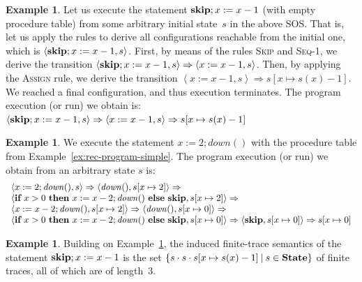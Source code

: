 \documentclass[10pt,a4paper]{amsart}
\theoremstyle{definition}
\newtheorem{example}[theorem]{Example}
\newcommand{\setdef}[2]{\left\{ #1 \>\middle|\> #2 \right\}}
\newcommand{\SOSTrans}[2]{#1 \Rightarrow #2}
\newcommand{\config}[2]{\left< #1, #2 \right>}
\newcommand{\SOSConfTrans}[4]{\SOSTrans{\config{#1}{#2}}{\config{#3}{#4}}}
\newcommand{\SOSConfFinTrans}[3]{\SOSTrans{\config{#1}{#2}}{#3}}
\newcommand{\Skip}{\mbox{\bf skip}}
\newcommand{\If}{\mbox{\bf if}}
\newcommand{\Then}{\mbox{\bf then}}
\newcommand{\Else}{\mbox{\bf else}}
\newcommand{\State}{\mbox{\bf State}}
\begin{document}
\begin{example}\label{ex:sos-simple}
  Let us execute the statement $\Skip ; x := x-1$ (with empty
  procedure table) from some arbitrary initial state~$s$ in the above
  SOS.
  That is, let us apply the rules to derive all configurations
  reachable from the initial one, which is
  $\config{\Skip ; x := x-1}{s}$.
  First, by means of the rules \textsc{Skip} and \textsc{Seq-1}, we
  derive the transition
  $\SOSConfTrans{\Skip ; x := x-1}{s}{x := x-1}{s}$.
  Then, by applying the \textsc{Assign} rule, we derive the transition
  $\SOSConfFinTrans{x := x-1}{s}{s [x \mapsto s(x)-1]}$.
  We reached a final configuration, and thus execution terminates.
  The program execution (or run) we obtain is:
  $
  \config{\Skip ; x := x-1}{s}  \Rightarrow
  \config{x := x-1}{s}          \Rightarrow
  s [x \mapsto s(x)-1]
  $
\end{example}

\begin{example}\label{ex:sos-rec}
  We execute the statement $x:=2;\mathit{down}()$ with the procedure
  table from Example~\ref{ex:rec-program-simple}.  The program
  execution (or run) we obtain from an arbitrary state $s$ is:
  $$
  \begin{array}{l}
  \config{x:=2;\mathit{down}()}{s}  \Rightarrow
  \config{\mathit{down}()}{s[x \mapsto 2]}  \Rightarrow \\
  \config{\If\ x > 0\ \Then\ x := x-2; \mathit{down}()\ \Else\ \Skip}{s[x \mapsto 2]}  \Rightarrow \\
  \config{x := x-2; \mathit{down}()}{s[x \mapsto 2]}  \Rightarrow 
  \config{\mathit{down}()}{s[x \mapsto 0]}  \Rightarrow \\
  \config{\If\ x > 0\ \Then\ x := x-2; \mathit{down}()\ \Else\ \Skip}{s[x \mapsto 0]}  \Rightarrow 
  \config{\Skip}{s[x \mapsto 0]}  \Rightarrow s[x \mapsto 0]
  \end{array}
  $$
\end{example}

\begin{example}
  Building on Example~\ref{ex:sos-simple}, the induced finite-trace
  semantics of the statement $\Skip ; x := x-1$ is the set
  $
    \setdef{s \cdot s \cdot s[x \mapsto s(x) - 1]}{s \in \State}
  $
  of finite traces, all of which are of length~$3$.
\end{example}
\end{document}
